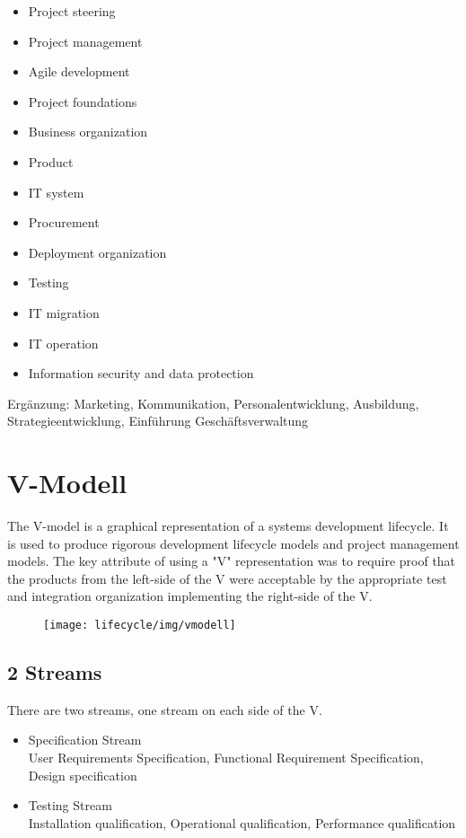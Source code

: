 \begin{minipage}[t]{0.5\linewidth}
\begin{itemize}
\item Project steering
\item Project management
\item Agile development
\item Project foundations
\item Business organization
\item Product
\item IT system
\item Procurement
\item Deployment organization
\item Testing
\item IT migration
\item IT operation
\item Information security and data protection
\end{itemize}
Ergänzung: Marketing, Kommunikation, Personalentwicklung, Ausbildung, Strategieentwicklung, Einführung Geschäftsverwaltung
\newslide

\section{V-Modell}
The V-model is a graphical representation of a systems development
lifecycle. It is used to produce rigorous development lifecycle models
and project management models. The key attribute of using a
"V" representation was to require proof that the products from the left-side
of the V were acceptable by the appropriate test and integration
organization implementing the right-side of the V.\\

\vspace{3mm}

\begin{figure}[H]
\texttt{[image: lifecycle/img/vmodell]}
\end{figure}

\subsection{2 Streams}
There are two streams, one stream on each side of the V.
\begin{itemize}
\item Specification Stream\\
User Requirements Specification, Functional Requirement Specification, Design specification
\item Testing Stream\\
Installation qualification, Operational qualification, Performance qualification
\end{itemize}


\end{minipage}
